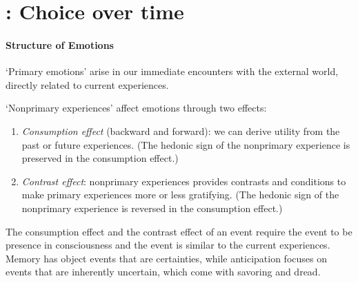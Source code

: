 \documentclass[11pt]{elegantbook}
\begin{document}
\section{\cite{loewenstein1992choice}: Choice over time}
\paragraph*{Structure of Emotions} `Primary emotions' arise in our immediate encounters with the external world, directly related to current experiences.

`Nonprimary experiences' affect emotions through two effects:
\begin{enumerate}
    \item \textit{Consumption effect} (backward and forward): we can derive utility from the past or future experiences. (The hedonic sign of the nonprimary experience is preserved in the consumption effect.)
    \item \textit{Contrast effect}: nonprimary experiences provides contrasts and conditions to make primary experiences more or less gratifying. (The hedonic sign of the nonprimary experience is reversed in the consumption effect.)
\end{enumerate}

The consumption effect and the contrast effect of an event require the event to be presence in consciousness and the event is similar to the current experiences. Memory has object events that are certainties, while anticipation focuses on events that are inherently uncertain, which come with savoring and dread.
\end{document}
